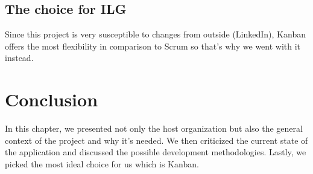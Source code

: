 \subsection{The choice for ILG}
Since this project is very susceptible to changes from outside (LinkedIn), Kanban offers the most flexibility in comparison to Scrum so that’s why we went with it instead.

\setcounter{secnumdepth}{0} %
\section{Conclusion}
In this chapter, we presented not only the host organization but also the general context of the project and why it's needed.
We then criticized the current state of the  application and discussed the possible development methodologies.
Lastly, we picked the most ideal choice for us which is Kanban.
